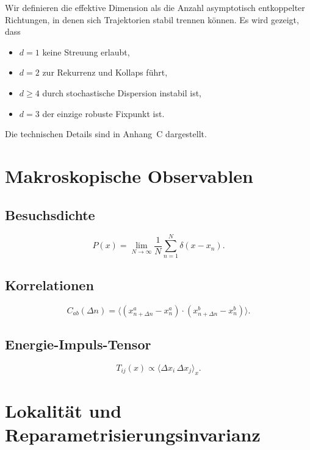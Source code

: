 \documentclass[11pt,a4paper]{article}
\begin{document}
Wir definieren die effektive Dimension als die Anzahl asymptotisch entkoppelter Richtungen, in denen sich Trajektorien stabil trennen können. Es wird gezeigt, dass
\begin{itemize}
 \item $d=1$ keine Streuung erlaubt,
 \item $d=2$ zur Rekurrenz und Kollaps f\"uhrt,
 \item $d\geq 4$ durch stochastische Dispersion instabil ist,
 \item $d=3$ der einzige robuste Fixpunkt ist.
\end{itemize}

Die technischen Details sind in Anhang~C dargestellt.

\section{Makroskopische Observablen}

\subsection{Besuchsdichte}

\begin{equation}
 P(x) = \lim_{N\to\infty} \frac{1}{N} \sum_{n=1}^N \delta(x-x_n).
\end{equation}

\subsection{Korrelationen}

\begin{equation}
 C_{ab}(\Delta n) = \langle (x^a_{n+\Delta n}-x^a_n) \cdot (x^b_{n+\Delta n}-x^b_n) \rangle.
\end{equation}

\subsection{Energie-Impuls-Tensor}

\begin{equation}
 T_{ij}(x) \propto \langle \Delta x_i \, \Delta x_j \rangle_x.
\end{equation}

\section{Lokalit\"at und Reparametrisierungsinvarianz}
\end{document}
